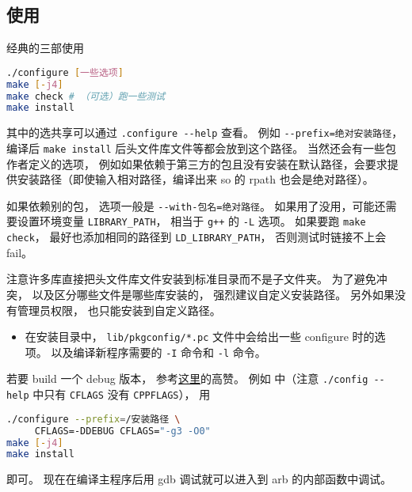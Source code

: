
\begin{issues}
\issueDraft
\end{issues}


\subsection{使用}
经典的三部使用
\begin{lstlisting}[language=bash]
./configure [一些选项]
make [-j4]
make check # （可选）跑一些测试
make install
\end{lstlisting}
其中的选共享可以通过 \verb`.configure --help` 查看。 例如 \verb`--prefix=绝对安装路径`， 编译后 \verb`make install` 后头文件库文件等都会放到这个路径。 当然还会有一些包作者定义的选项， 例如如果依赖于第三方的包且没有安装在默认路径，会要求提供安装路径（即使输入相对路径，编译出来 so 的 rpath 也会是绝对路径）。

如果依赖别的包， 选项一般是 \verb`--with-包名=绝对路径`。 如果用了没用，可能还需要设置环境变量 \verb`LIBRARY_PATH`， 相当于 \verb`g++` 的 \verb`-L` 选项。 如果要跑 \verb`make check`， 最好也添加相同的路径到 \verb`LD_LIBRARY_PATH`， 否则测试时链接不上会 fail。

注意许多库直接把头文件库文件安装到标准目录而不是子文件夹。 为了避免冲突， 以及区分哪些文件是哪些库安装的， 强烈建议自定义安装路径。 另外如果没有管理员权限， 也只能安装到自定义路径。

\begin{itemize}
\item 在安装目录中， \verb`lib/pkgconfig/*.pc` 文件中会给出一些 configure 时的选项。 以及编译新程序需要的 \verb`-I` 命令和 \verb`-l` 命令。
\end{itemize}

若要 build 一个 debug 版本， 参考\href{https://stackoverflow.com/questions/4553735/gnu-autotools-debug-release-targets}{这里}的高赞。 例如  中（注意 \verb`./config --help` 中只有 \verb`CFLAGS` 没有 \verb`CPPFLAGS`）， 用
\begin{lstlisting}[language=bash]
./configure --prefix=/安装路径 \
     CFLAGS=-DDEBUG CFLAGS="-g3 -O0"
make [-j4]
make install
\end{lstlisting}
即可。 现在在编译主程序后用 gdb 调试就可以进入到 arb 的内部函数中调试。

